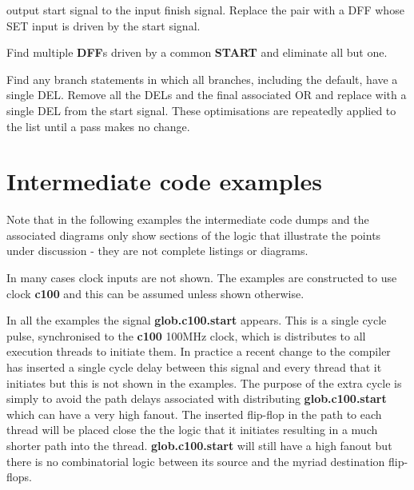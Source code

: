                output start signal to the input finish signal. Replace the
                pair with a DFF whose SET input is driven by the start signal.
        \item   Find multiple {\bf DFF}s driven by a common {\bf START} and
                eliminate all but one.
        \item   Find any branch statements in which all branches, including
                the default, have a single DEL. Remove all the DELs and the
                final associated OR and replace with a single DEL from the
                start signal.
        \blend
        These optimisations are repeatedly applied to the list until a pass
        makes no change.


    \section{Intermediate code examples}

    
        Note that in the following examples the intermediate code dumps and the
        associated diagrams only show sections of the logic that illustrate the
        points under discussion - they are not complete listings or diagrams.
        
        In many cases clock inputs are not shown. The examples are constructed
        to use clock {\bf c100} and this can be assumed unless shown otherwise.
        
        In all the examples the signal {\bf glob.c100.start} appears. This is
        a single cycle pulse, synchronised to the {\bf c100} 100MHz clock, which
        is distributes to all execution threads to initiate them. In practice
        a recent change to the compiler has inserted a single cycle delay
        between this signal and every thread that it initiates but this is not
        shown in the examples. The purpose of the extra cycle is simply to avoid
        the path delays associated with distributing {\bf glob.c100.start} which
        can have a very high fanout. The inserted flip-flop in the path to each
        thread will be placed close the the logic that it initiates resulting
        in a much shorter path into the thread. {\bf glob.c100.start} will still
        have a high fanout but there is no combinatorial logic between its
        source and the myriad destination flip-flops.
    
